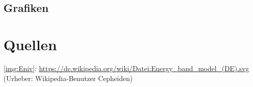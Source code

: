 \documentclass[numbers=noenddot,12pt,a4paper]{scrartcl}
\begin{document}
\subsection{Grafiken}
\section{Quellen}
\ref{img:Eniv}: \url{https://de.wikipedia.org/wiki/Datei:Energy_band_model_(DE).svg} (Urheber: Wikipedia-Benutzer Cepheiden)
\end{document}
